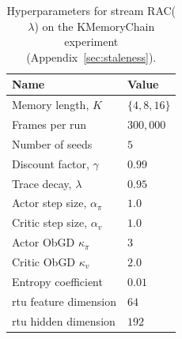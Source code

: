 \documentclass{article}
\begin{document}
  \begin{table}[htbp]
  \centering
  \caption{Hyperparameters for stream RAC($\lambda$) on the KMemoryChain experiment
  (Appendix~\ref{sec:staleness}).}
  \label{tab:hparams-StreamAC-KMemoryChain}
  \begin{tabular}{ll}
  \toprule
  Name & Value \\
  \midrule
  Memory length, $K$                     & $\{4, 8, 16\}$ \\
  Frames per run                         & $300{,}000$ \\
  Number of seeds                        & $5$ \\
  Discount factor, $\gamma$              & $0.99$ \\
  Trace decay, $\lambda$                 & $0.95$ \\
  Actor step size, $\alpha_\pi$          & $1.0$ \\
  Critic step size, $\alpha_v$           & $1.0$ \\
  Actor ObGD $\kappa_\pi$                & $3$ \\
  Critic ObGD $\kappa_v$                 & $2.0$ \\
  Entropy coefficient                    & $0.01$ \\
  \gls{rtu} feature dimension            & $64$ \\
  \gls{rtu} hidden dimension             & $192$ \\
  \bottomrule
  \end{tabular}
  \end{table}
\end{document}
